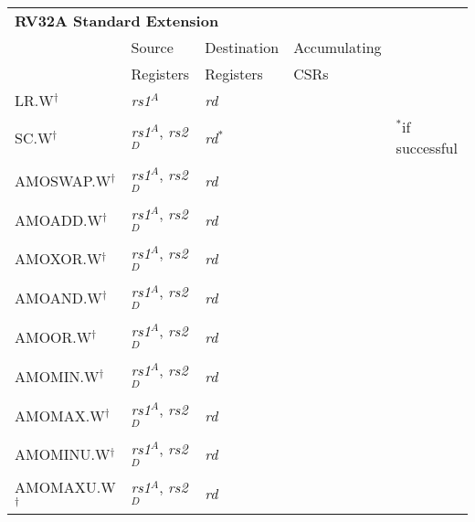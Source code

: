\begin{tabular}{p{3cm}|p{3cm}|p{2cm}|p{4cm}|p{4cm}}
  \multicolumn{4}{l}{\bf RV32A Standard Extension} \\
  \cline{2-4}
   & Source    & Destination & Accumulating \\
   & Registers & Registers   & CSRs \\
  \cline{2-4}
   LR.W$^\dagger$ & {\em rs1}$^A$ & {\em rd} &   & \\
   \cline{2-4}
   SC.W$^\dagger$ & {\em rs1}$^A$, {\em rs2}$^D$ & {\em rd}$^*$ & & $^*$if successful  \\
   \cline{2-4}
   AMOSWAP.W$^\dagger$ & {\em rs1}$^A$, {\em rs2}$^D$ & {\em rd} &   & \\
   \cline{2-4}
   AMOADD.W$^\dagger$ & {\em rs1}$^A$, {\em rs2}$^D$ & {\em rd} &   & \\
   \cline{2-4}
   AMOXOR.W$^\dagger$ & {\em rs1}$^A$, {\em rs2}$^D$ & {\em rd} &   & \\
   \cline{2-4}
   AMOAND.W$^\dagger$ & {\em rs1}$^A$, {\em rs2}$^D$ & {\em rd} &   & \\
   \cline{2-4}
   AMOOR.W$^\dagger$ & {\em rs1}$^A$, {\em rs2}$^D$ & {\em rd} &   & \\
   \cline{2-4}
   AMOMIN.W$^\dagger$ & {\em rs1}$^A$, {\em rs2}$^D$ & {\em rd} &   & \\
   \cline{2-4}
   AMOMAX.W$^\dagger$ & {\em rs1}$^A$, {\em rs2}$^D$ & {\em rd} &   & \\
   \cline{2-4}
   AMOMINU.W$^\dagger$ & {\em rs1}$^A$, {\em rs2}$^D$ & {\em rd} &   & \\
   \cline{2-4}
   AMOMAXU.W$^\dagger$ & {\em rs1}$^A$, {\em rs2}$^D$ & {\em rd} &   & \\
   \cline{2-4}
\end{tabular}

